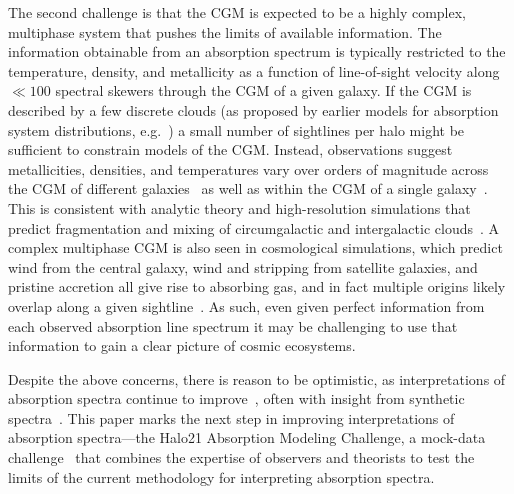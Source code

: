 \documentclass[fleqn,usenatbib]{mnras}
\begin{document}
The second challenge is that the CGM is expected to be a highly complex, multiphase system that pushes the limits of available information.
The information obtainable from an absorption spectrum is typically restricted to the temperature, density, and metallicity as a function of line-of-sight velocity along $\ll 100$ spectral skewers through the CGM of a given galaxy.
If the CGM is described by a few discrete clouds (as proposed by earlier models for absorption system distributions, e.g.~\citealt{srianand1994Halo, das2001Unified, maller2003Damped}) a small number of sightlines per halo might be sufficient to constrain models of the CGM.
Instead, observations suggest metallicities, densities, and temperatures vary over orders of magnitude across the CGM of different galaxies~\citep[e.g.][]{Lehner2019, Lehner2022} as well as within the CGM of a single galaxy~\citep[e.g.][]{lehner2020Project}.
This is consistent with analytic theory and high-resolution simulations that predict fragmentation and mixing of circumgalactic and intergalactic clouds~\citep[e.g.][]{maller2004Multiphase, mccourt2018Characteristic, hummels2019Impact, vandevoort2019Cosmological, peeples2019Figuring, mandelker2019Shattering, Mandelker.etal.2021}.
A complex multiphase CGM is also seen in cosmological simulations, which predict wind from the central galaxy, wind and stripping from satellite galaxies, and pristine accretion all give rise to absorbing gas, and in fact multiple origins likely overlap along a given sightline~\citep[e.g.][]{hafen2019Origins, hafen2020Fates, saeedzadeh2023Cool}.
As such, even given perfect information from each observed absorption line spectrum it may be challenging to use that information to gain a clear picture of cosmic ecosystems.

Despite the above concerns, there is reason to be optimistic,
as interpretations of absorption spectra continue to improve~\citep[e.g.][]{churchill2015Direct, sameer2021Cloudbycloud}, often with insight from synthetic spectra~\citep[e.g.][]{hummels2013Constraints, liang2018Observing}.
This paper marks the next step in improving interpretations of absorption spectra---the Halo21 Absorption Modeling Challenge, a mock-data challenge~\citep[e.g.][]{regimbau2012Mock, meacher2015Mock, hazboun2019Second} that combines the expertise of observers and theorists to test the limits of the current methodology for interpreting absorption spectra.
\end{document}

